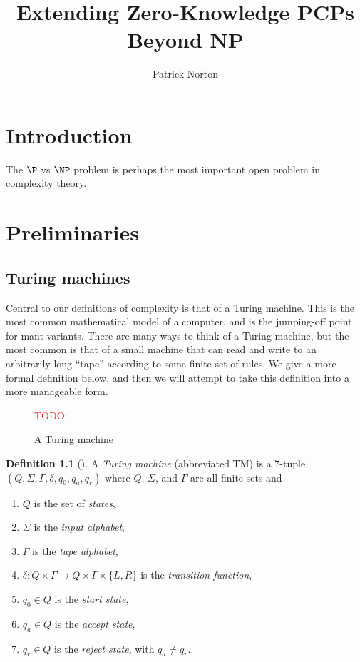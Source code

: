 \documentclass[english,12pt]{reedthesis}
\title{Extending Zero-Knowledge PCPs Beyond NP}
\author{Patrick Norton}
\theoremstyle{plain}
\theoremstyle{definition}
\newtheorem{defn}[defn]{Definition}
\theoremstyle{remark}
\newcommand{\TODO}[1]{\textcolor{red}{TODO: #1}}
\begin{document}
\maketitle

\tableofcontents

\listofalgorithms


\chapter*{Introduction}

The $\P$ vs $\NP$ problem is perhaps the most important open problem in
complexity theory.

\chapter{Preliminaries}

\section{Turing machines}

Central to our definitions of complexity is that of a Turing machine. This is
the most common mathematical model of a computer, and is the jumping-off point
for mant variants. There are many ways to think of a Turing machine, but the
most common is that of a small machine that can read and write to an
arbitrarily-long ``tape'' according to some finite set of rules. We give a more
formal definition below, and then we will attempt to take this definition into a
more manageable form.

\begin{figure}[htbp]
  \centering
  \TODO{}
  \begin{tikzpicture}
  \end{tikzpicture}
  \caption{A Turing machine}\label{fig:tm}
\end{figure}

\begin{defn}[{\cite[Def.\ 3.1]{Sip97}}]\label{def:TM}
  A \emph{Turing machine} (abbreviated TM) is a 7-tuple
  $(Q, \Sigma, \Gamma, \delta, q_{0}, q_{a}, q_{r})$ where $Q$, $\Sigma$, and $\Gamma$ are all finite
  sets and
  \begin{enumerate}
    \item $Q$ is the set of \emph{states},
    \item $\Sigma$ is the \emph{input alphabet},
    \item $\Gamma$ is the \emph{tape alphabet},
    \item $\delta\colon Q \times \Gamma \rightarrow Q \times \Gamma \times \{L, R\}$ is the \emph{transition function},
    \item $q_{0} \in Q$ is the \emph{start state},
    \item $q_{a} \in Q$ is the \emph{accept state},
    \item $q_{r} \in Q$ is the \emph{reject state}, with $q_{a} \ne q_{r}$.
  \end{enumerate}
\end{defn}
\end{document}
